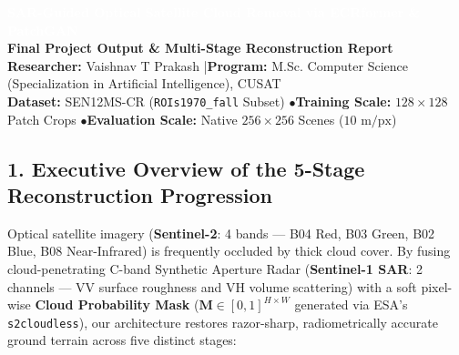 \documentclass[10pt,a4paper]{article}
\begin{document}
\begin{tcolorbox}[colback=navy,colframe=navy,arc=5pt,top=10pt,bottom=10pt,left=10pt,right=10pt]
\begin{center}
    {\LARGE \textbf{\textcolor{white}{SAR-Guided Optical Satellite Cloud Removal via ECRformer \& PatchGAN}}}\\[4pt]
    {\large \textbf{\textcolor{cyan!40!white}{Final Project Output \& Multi-Stage Reconstruction Report}}}\\[4pt]
    {\small \textcolor{gray!20!white}{\textbf{Researcher:} Vaishnav T Prakash \quad|\quad \textbf{Program:} M.Sc. Computer Science (Specialization in Artificial Intelligence), CUSAT}}\\[2pt]
    {\footnotesize \textcolor{yellow!60!white}{\textbf{Dataset:} SEN12MS-CR (\texttt{ROIs1970\_fall} Subset) \quad$\bullet$\quad \textbf{Training Scale:} $128\times 128$ Patch Crops \quad$\bullet$\quad \textbf{Evaluation Scale:} Native $256\times 256$ Scenes ($10\text{ m/px}$)}}
\end{center}
\end{tcolorbox}

\subsection*{1. Executive Overview of the 5-Stage Reconstruction Progression}
Optical satellite imagery (\textbf{Sentinel-2}: 4 bands — B04 Red, B03 Green, B02 Blue, B08 Near-Infrared) is frequently occluded by thick cloud cover. By fusing cloud-penetrating C-band Synthetic Aperture Radar (\textbf{Sentinel-1 SAR}: 2 channels — VV surface roughness and VH volume scattering) with a soft pixel-wise \textbf{Cloud Probability Mask} ($\mathbf{M} \in [0, 1]^{H\times W}$ generated via ESA's \texttt{s2cloudless}), our architecture restores razor-sharp, radiometrically accurate ground terrain across five distinct stages:
\end{document}
